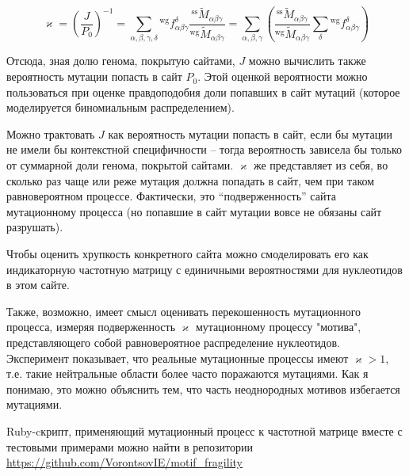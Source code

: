 \documentclass[a4paper]{article}
\begin{document}
\begin{equation}
\boxed{
\varkappa = \left(\frac{J}{P_0}\right)^{-1} = \sum_{\alpha,\beta,\gamma,\delta}{}^{\textrm{wg}}f_{\alpha\beta\gamma}^{\delta} \frac{{}^{\textrm{ss}}\widetilde{M}_{\alpha\beta\gamma}}{{}^{\textrm{wg}}\widetilde{M}_{\alpha\beta\gamma}} = \sum_{\alpha,\beta,\gamma}\left(\frac{{}^{\textrm{ss}}\widetilde{M}_{\alpha\beta\gamma}}{{}^{\textrm{wg}}\widetilde{M}_{\alpha\beta\gamma}}\sum_{\delta}{}^{\textrm{wg}}f_{\alpha\beta\gamma}^{\delta}\right)
}
\end{equation}

Отсюда, зная долю генома, покрытую сайтами, $J$ можно вычислить также вероятность мутации попасть в сайт $P_0$. Этой оценкой вероятности можно пользоваться при оценке правдоподобия доли попавших в сайт мутаций (которое моделируется биномиальным распределением).

Можно трактовать $J$ как вероятность мутации попасть в сайт, если бы мутации не имели бы контекстной специфичности -- тогда вероятность зависела бы только от суммарной доли генома, покрытой сайтами. $\varkappa$ же представляет из себя, во сколько раз чаще или реже мутация должна попадать в сайт, чем при таком равновероятном процессе. Фактически, это ``подверженность'' сайта мутационному процесса (но попавшие в сайт мутации вовсе не обязаны сайт разрушать).

Чтобы оценить хрупкость конкретного сайта можно смоделировать его как индикаторную частотную матрицу с единичными вероятностями для нуклеотидов в этом сайте.

Также, возможно, имеет смысл оценивать перекошенность мутационного процесса, измеряя подверженность $\varkappa$ мутационному процессу "мотива", представляющего собой равновероятное распределение нуклеотидов. Эксперимент показывает, что реальные мутационные процессы имеют $\varkappa > 1$, т.е. такие нейтральные области более часто поражаются мутациями. Как я понимаю, это можно объяснить тем, что часть неоднородных мотивов избегается мутациями.

Ruby-cкрипт, применяющий мутационный процесс к частотной матрице вместе с тестовыми примерами можно найти в репозитории \url{https://github.com/VorontsovIE/motif_fragility}
\end{document}
